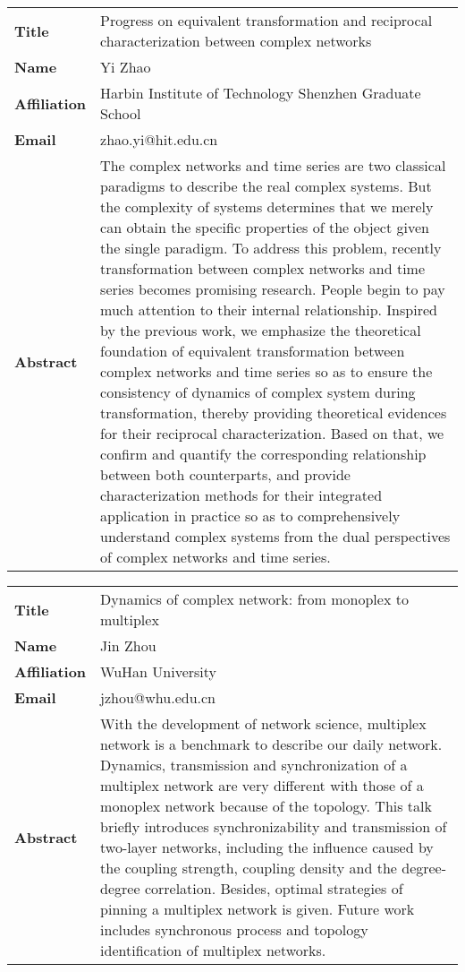 \documentclass[oneside,A4paper,12pt]{article}
\begin{document}
\newpage
\begin{longtable}{p{2cm}p{14cm}}
\toprule
\textbf{Title} & Progress on equivalent transformation and reciprocal characterization between complex networks\\
\textbf{Name} & Yi Zhao\\
\textbf{Affiliation} & Harbin Institute of Technology Shenzhen Graduate School\\
\textbf{Email} & zhao.yi@hit.edu.cn\\
\textbf{Abstract} & The complex networks and time series are two classical paradigms to describe the real complex systems. But the complexity of systems determines that we merely can obtain the specific properties of the object given the single paradigm. To address this problem, recently transformation between complex networks and time series becomes promising research. People begin to pay much attention to their internal relationship. Inspired by the previous work, we emphasize the theoretical foundation of equivalent transformation between complex networks and time series so as to ensure the consistency of dynamics of complex system during transformation, thereby providing theoretical evidences for their reciprocal characterization. Based on that, we confirm and quantify the corresponding relationship between both counterparts, and provide characterization methods for their integrated application in practice so as to comprehensively understand complex systems from the dual perspectives of complex networks and time series.\\
\bottomrule
\end{longtable}

\newpage
\begin{longtable}{p{2cm}p{14cm}}
\toprule
\textbf{Title} & Dynamics of complex network: from monoplex to multiplex\\
\textbf{Name} & Jin Zhou\\
\textbf{Affiliation} & WuHan University\\
\textbf{Email} & jzhou@whu.edu.cn\\
\textbf{Abstract} & With the development of network science, multiplex network is a benchmark to describe our daily network. Dynamics, transmission and synchronization of a multiplex network are very different with those of a monoplex network because of the topology. This talk briefly introduces synchronizability and transmission of two-layer networks, including the influence caused by the coupling strength, coupling density and the degree-degree correlation. Besides, optimal strategies of pinning a multiplex network is given. Future work includes synchronous process and topology identification of multiplex networks.\\
\bottomrule
\end{longtable}
\end{document}
